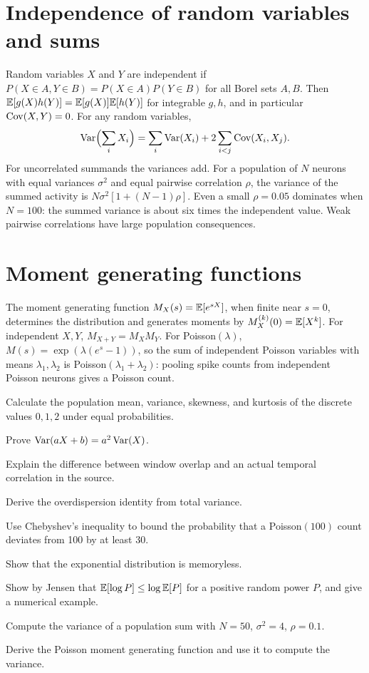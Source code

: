 \section{Independence of random variables and sums}
Random variables $X$ and $Y$ are independent if $P(X\in A,Y\in B)=P(X\in A)P(Y\in B)$ for all Borel sets $A,B$. Then $\mathbb E[g(X)h(Y)]=\mathbb E[g(X)]\mathbb E[h(Y)]$ for integrable $g,h$, and in particular $\operatorname{Cov}(X,Y)=0$. For any random variables,
\[
\operatorname{Var}\Bigl(\sum_iX_i\Bigr)=\sum_i\operatorname{Var}(X_i)+2\sum_{i<j}\operatorname{Cov}(X_i,X_j).
\]
For uncorrelated summands the variances add. For a population of $N$ neurons with equal variances $\sigma^2$ and equal pairwise correlation $\rho$, the variance of the summed activity is $N\sigma^2[1+(N-1)\rho]$. Even a small $\rho=0.05$ dominates when $N=100$: the summed variance is about six times the independent value. Weak pairwise correlations have large population consequences.

\section{Moment generating functions}
The moment generating function $M_X(s)=\mathbb E[e^{sX}]$, when finite near $s=0$, determines the distribution and generates moments by $M_X^{(k)}(0)=\mathbb E[X^k]$. For independent $X,Y$, $M_{X+Y}=M_XM_Y$. For Poisson$(\lambda)$, $M(s)=\exp(\lambda(e^s-1))$, so the sum of independent Poisson variables with means $\lambda_1,\lambda_2$ is Poisson$(\lambda_1+\lambda_2)$: pooling spike counts from independent Poisson neurons gives a Poisson count.
\begin{exercises}
\item Calculate the population mean, variance, skewness, and kurtosis of the discrete values $0,1,2$ under equal probabilities.
\item Prove $\operatorname{Var}(aX+b)=a^2\operatorname{Var}(X)$.
\item Explain the difference between window overlap and an actual temporal correlation in the source.
\item Derive the overdispersion identity from total variance.
\item Use Chebyshev's inequality to bound the probability that a Poisson$(100)$ count deviates from 100 by at least 30.
\item Show that the exponential distribution is memoryless.
\item Show by Jensen that $\mathbb E[\log P]\le\log\mathbb E[P]$ for a positive random power $P$, and give a numerical example.
\item Compute the variance of a population sum with $N=50$, $\sigma^2=4$, $\rho=0.1$.
\item Derive the Poisson moment generating function and use it to compute the variance.
\end{exercises}
